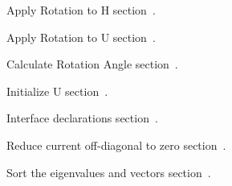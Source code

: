 \Wmods
\:Apply Rotation to H\X \X
\WU section~.

\:Apply Rotation to U\X \X
\WU section~.

\:Calculate Rotation Angle\X \X
\WU section~.

\:Initialize U\X \X
\WU section~.

\:Interface declarations\X \X
\WU section~.

\:Reduce current off-diagonal to zero\X \X
\WU section~.

\:Sort the eigenvalues and vectors\X \X
\WU section~.


